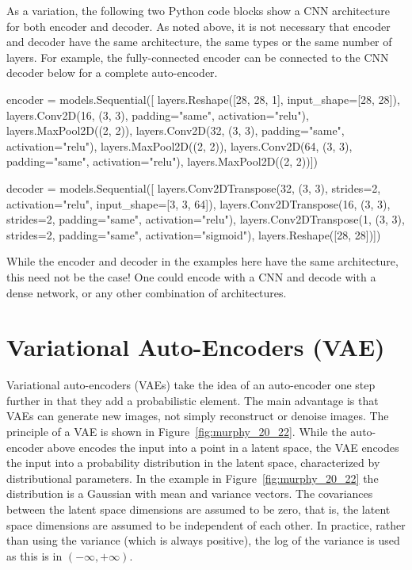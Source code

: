 As a variation, the following two Python code blocks show a CNN architecture for both encoder and decoder. As noted above, it is not necessary that encoder and decoder have the same architecture, the same types or the same number of layers. For example, the fully-connected encoder can be connected to the CNN decoder below for a complete auto-encoder.

\begin{pythoncode}
encoder = models.Sequential([
    layers.Reshape([28, 28, 1], input_shape=[28, 28]),
    layers.Conv2D(16, (3, 3), padding="same", activation="relu"),
    layers.MaxPool2D((2, 2)),
    layers.Conv2D(32, (3, 3), padding="same", activation="relu"),
    layers.MaxPool2D((2, 2)),
    layers.Conv2D(64, (3, 3), padding="same", activation="relu"),
    layers.MaxPool2D((2, 2))])
\end{pythoncode}

\begin{pythoncode}
decoder = models.Sequential([
    layers.Conv2DTranspose(32, (3, 3), strides=2, 
               activation="relu", input_shape=[3, 3, 64]),
    layers.Conv2DTranspose(16, (3, 3), strides=2, 
               padding="same", activation="relu"),
    layers.Conv2DTranspose(1, (3, 3), strides=2, 
               padding="same", activation="sigmoid"),
    layers.Reshape([28, 28])])
\end{pythoncode}


\begin{infobox}
While the encoder and decoder in the examples here have the same architecture, this need not be the case! One could encode with a CNN and decode with a dense network, or any other combination of architectures.
\end{infobox}

\FloatBarrier

\section{Variational Auto-Encoders (VAE)}
\label{sec:vae}

Variational auto-encoders (VAEs) take the idea of an auto-encoder one step further in that they add a probabilistic element. The main advantage is that VAEs can generate new images, not simply reconstruct or denoise images. The principle of a VAE is shown in Figure~\ref{fig:murphy_20_22}. While the auto-encoder above encodes the input into a point in a latent space, the VAE encodes the input into a probability distribution in the latent space, characterized by distributional parameters. In the example in Figure~\ref{fig:murphy_20_22} the distribution is a Gaussian with mean and variance vectors. The covariances between the latent space dimensions are assumed to be zero, that is, the latent space dimensions are assumed to be independent of each other. In practice, rather than using the variance (which is always positive), the log of the variance is used as this is in $(-\infty, +\infty)$.

